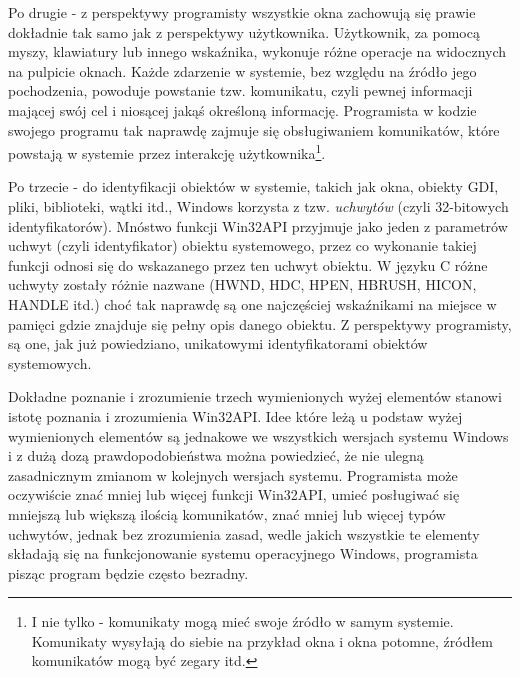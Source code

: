 Po drugie - z perspektywy programisty wszystkie okna zachowują się prawie dokładnie tak samo
jak z perspektywy użytkownika. Użytkownik, za pomocą myszy, klawiatury lub innego wskaźnika, wykonuje
różne operacje na widocznych na pulpicie oknach. Każde zdarzenie w systemie, bez względu na źródło jego
pochodzenia, powoduje powstanie tzw. {komunikatu}, czyli pewnej informacji mającej swój cel i niosącej
jakąś określoną informację. Programista w kodzie swojego programu tak naprawdę 
zajmuje się obsługiwaniem komunikatów, które powstają w systemie przez interakcję 
użytkownika\footnote{I nie tylko - komunikaty mogą mieć swoje źródło w samym systemie. 
Komunikaty wysyłają do siebie na przykład okna i okna potomne, źródłem komunikatów mogą być zegary itd.}.

Po trzecie - do identyfikacji obiektów w systemie, takich jak okna, obiekty GDI, pliki, biblioteki, 
wątki itd., Windows korzysta z tzw. {\em uchwytów} (czyli 32-bitowych identyfikatorów). Mnóstwo
funkcji Win32API przyjmuje jako jeden z parametrów uchwyt (czyli identyfikator) obiektu systemowego, przez
co wykonanie takiej funkcji odnosi się do wskazanego przez ten uchwyt obiektu. W języku C różne uchwyty
zostały różnie nazwane (HWND, HDC, HPEN, HBRUSH, HICON, HANDLE itd.) choć tak naprawdę są one najczęściej
wskaźnikami na miejsce w pamięci gdzie znajduje się pełny opis danego obiektu. Z perspektywy programisty, są
one, jak już powiedziano, unikatowymi identyfikatorami obiektów systemowych. 

Dokładne poznanie i zrozumienie trzech wymienionych wyżej elementów stanowi istotę poznania i
zrozumienia Win32API. Idee które leżą u podstaw wyżej wymienionych elementów są jednakowe
we wszystkich wersjach systemu Windows i z dużą dozą prawdopodobieństwa można powiedzieć, że nie 
ulegną zasadnicznym zmianom w kolejnych wersjach systemu. Programista może oczywiście znać mniej
lub więcej funkcji Win32API, umieć posługiwać się mniejszą lub większą ilością komunikatów, znać
mniej lub więcej typów uchwytów, jednak bez zrozumienia zasad, wedle jakich wszystkie te elementy
składają się na funkcjonowanie systemu operacyjnego Windows, programista pisząc program 
będzie często bezradny.

